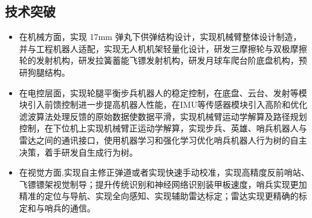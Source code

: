 \subsection{技术突破}


    \begin{itemize}
        \item 在机械方面，实现 17mm 弹丸下供弹结构设计，实现机械臂整体设计制造，并与工程机器人适配，实现无人机机架轻量化设计，研发三摩擦轮与双极摩擦轮的发射机构，研发拉簧蓄能飞镖发射机构，研发月球车爬台阶底盘机构，预研狗腿结构。
        \item 在电控层面，实现轮腿平衡步兵机器人的稳定控制，在底盘、云台、发射等模块引入前馈控制进一步提高机器人性能，在IMU等传感器模块引入高阶和优化滤波算法处理反馈的原始数据使数据平滑，实现机械臂运动学解算及路径规划控制，在下位机上实现机械臂正运动学解算，实现步兵、英雄、哨兵机器人与雷达之间的通讯接口，使用机器学习和强化学习优化哨兵机器人行为树的自主决策，着手研发自生成行为树。
        \item 在视觉方面,实现自主修正弹道或者实现快速手动校准，实现高精度反前哨站、飞镖镖架视觉制导；提升传统识别和神经网络识别装甲板速度，哨兵实现更加精准的定位与导航、实现全向感知、实现辅助雷达标定；雷达实现更精确的标定和与哨兵的通信。
    \end{itemize}